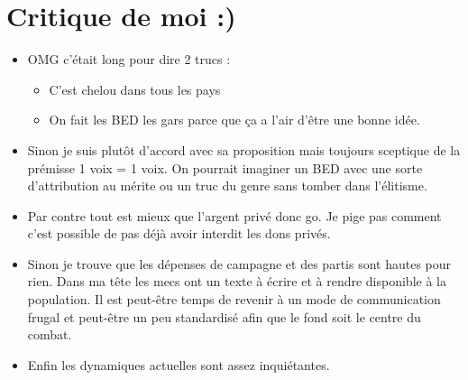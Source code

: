 \documentclass[10pt,t]{beamer}
\begin{document}
\section{Critique de moi :)}
\begin{frame}
    \begin{itemize}
        \item OMG c'était long pour dire 2 trucs :
        \begin{itemize}
            \item C'est chelou dans tous les pays
            \item On fait les BED les gars parce que ça a l'air d'être une bonne idée.
        \end{itemize}
        \item Sinon je suis plutôt d'accord avec sa proposition mais toujours sceptique de la prémisse 1 voix = 1 voix. On pourrait imaginer un BED avec une sorte d'attribution au mérite ou un truc du genre sans tomber dans l'élitisme.
        \item Par contre tout est mieux que l'argent privé donc go. Je pige pas comment c'est possible de pas déjà avoir interdit les dons privés.
        \item Sinon je trouve que les dépenses de campagne et des partis sont hautes pour rien. Dans ma tête les mecs ont un texte à écrire et à rendre disponible à la population. Il est peut-être temps de revenir à un mode de communication frugal et peut-être un peu standardisé afin que le fond soit le centre du combat.
        \item Enfin les dynamiques actuelles sont assez inquiétantes.
    \end{itemize}
\end{frame}
\end{document}
